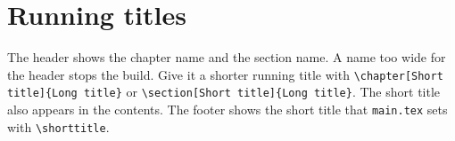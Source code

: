 \section{Running titles}
The header shows the chapter name and the section name. A name too wide for the header stops the build. Give it a shorter running title with \texttt{\textbackslash chapter[Short title]\{Long title\}} or \texttt{\textbackslash section[Short title]\{Long title\}}. The short title also appears in the contents. The footer shows the short title that \texttt{main.tex} sets with \texttt{\textbackslash shorttitle}.
